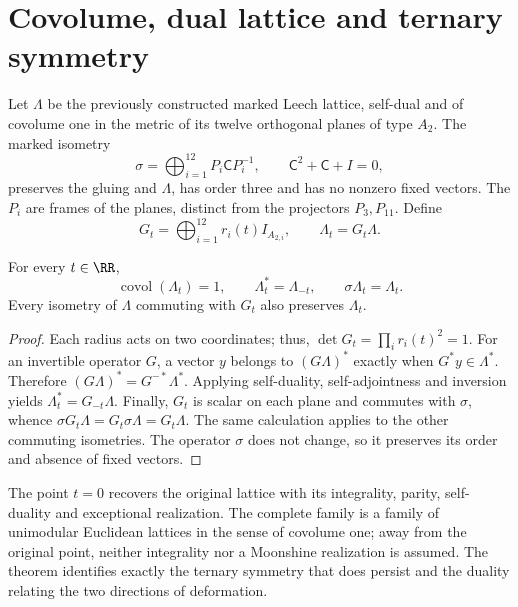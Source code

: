 \section{Covolume, dual lattice and ternary symmetry}

Let \(\Lambda\) be the previously constructed marked Leech lattice, self-dual and of covolume one in the metric of its twelve orthogonal planes of type \(A_2\). The marked isometry
\[
 \sigma=\bigoplus_{i=1}^{12}P_i\mathsf C P_i^{-1},\qquad
 \mathsf C^2+\mathsf C+I=0,
\]
preserves the gluing and \(\Lambda\), has order three and has no nonzero fixed vectors. The \(P_i\) are frames of the planes, distinct from the projectors \(P_3,P_{11}\). Define
\begin{equation}
 G_t=\bigoplus_{i=1}^{12}r_i(t)I_{A_{2,i}},\qquad
 \Lambda_t=G_t\Lambda.
 \label{x_reciprocidad:rec:eq:red}
\end{equation}

\begin{theorem}
\label{x_reciprocidad:rec:thm:red}
For every \(t\in\RR\),
\[
 \operatorname{covol}(\Lambda_t)=1,\qquad
 \Lambda_t^*=\Lambda_{-t},\qquad \sigma\Lambda_t=\Lambda_t.
\]
Every isometry of \(\Lambda\) commuting with \(G_t\) also preserves \(\Lambda_t\).
\end{theorem}
\begin{proof}
Each radius acts on two coordinates; thus,
\(\det G_t=\prod_i r_i(t)^2=1\). For an invertible operator \(G\), a vector \(y\) belongs to \((G\Lambda)^*\) exactly when \(G^*y\in\Lambda^*\). Therefore
\((G\Lambda)^*=G^{-*}\Lambda^*\). Applying self-duality, self-adjointness and inversion yields \(\Lambda_t^*=G_{-t}\Lambda\). Finally, \(G_t\) is scalar on each plane and commutes with \(\sigma\), whence
\(\sigma G_t\Lambda=G_t\sigma\Lambda=G_t\Lambda\). The same calculation applies to the other commuting isometries. The operator \(\sigma\) does not change, so it preserves its order and absence of fixed vectors.
\end{proof}

The point \(t=0\) recovers the original lattice with its integrality, parity, self-duality and exceptional realization. The complete family is a family of unimodular Euclidean lattices in the sense of covolume one; away from the original point, neither integrality nor a Moonshine realization is assumed. The theorem identifies exactly the ternary symmetry that does persist and the duality relating the two directions of deformation.

